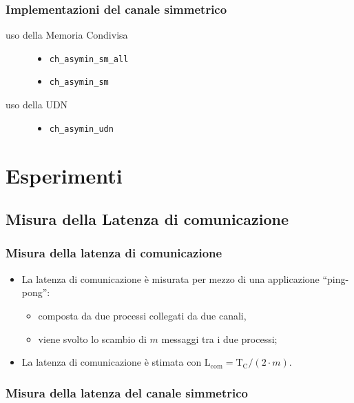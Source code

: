 \documentclass{beamer}
\newcommand{\Lcom}{\mathrm{L}_{\mathrm{com}}}
\newcommand{\Tc}{\mathrm{T}_{\mathrm{C}}}
\begin{document}
\begin{frame}[fragile]
  \frametitle{Implementazioni del canale simmetrico}
  \begin{description}
  \item [uso della Memoria Condivisa] \hfill
    \begin{itemize}
    \item \verb+ch_asymin_sm_all+ 
    \item \verb+ch_asymin_sm+ 
    \end{itemize}
  \item [uso della UDN] \hfill
    \begin{itemize}
    \item \verb+ch_asymin_udn+ 
    \end{itemize}
  \end{description}
\end{frame}


\section{Esperimenti}

\subsection{Misura della Latenza di comunicazione}

\begin{frame}
  \frametitle{Misura della latenza di comunicazione}
  \begin{itemize}
  \item La latenza di comunicazione \`e misurata per mezzo di una applicazione ``ping-pong'':
    \begin{itemize}
    \item composta da due processi collegati da due canali,
    \item viene svolto lo scambio di $m$ messaggi tra i due processi;
    \end{itemize}
  \item La latenza di comunicazione \`e stimata con $\Lcom = \Tc / (2 \cdot m)$.
  \end{itemize}
  \begin{figure}
  \end{figure}
\end{frame}

\begin{frame}
  \frametitle{Misura della latenza del canale simmetrico}
  \begin{figure}
    \resizebox{\columnwidth}{!}{}
  \end{figure}
\end{frame}
\end{document}
